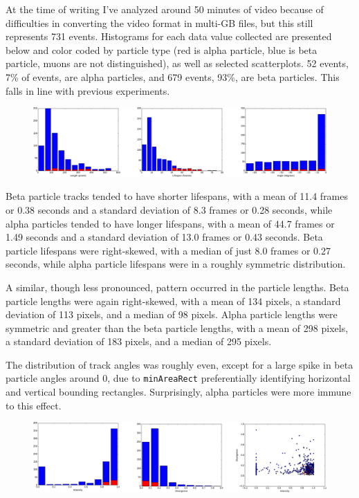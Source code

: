 \documentclass[notitlepage,12pt]{article}
\begin{document}
At the time of writing I've analyzed around 50 minutes of video because of difficulties in converting the video format in multi-GB files, but this still represents 731 events.  Histograms for each data value collected are presented below and color coded by particle type (red is alpha particle, blue is beta particle, muons are not distinguished), as well as selected scatterplots.  52 events, 7\% of events, are alpha particles, and 679 events, 93\%, are beta particles.  This falls in line with previous experiments.

\begin{figure}[h!]
	\centering
	\includegraphics[width=\textwidth]{length-life-angle}
\end{figure}

Beta particle tracks tended to have shorter lifespans, with a mean of 11.4 frames or 0.38 seconds and a standard deviation of 8.3 frames or 0.28 seconds, while alpha particles tended to have longer lifespans, with a mean of 44.7 frames or 1.49 seconds and a standard deviation of 13.0 frames or 0.43 seconds.  Beta particle lifespans were right-skewed, with a median of just 8.0 frames or 0.27 seconds, while alpha particle lifespans were in a roughly symmetric distribution. 

A similar, though less pronounced, pattern occurred in the particle lengths.  Beta particle lengths were again right-skewed, with a mean of 134 pixels, a standard deviation of 113 pixels, and a median of 98 pixels.  Alpha particle lengths were symmetric and greater than the beta particle lengths, with a mean of 298 pixels, a standard deviation of 183 pixels, and a median of 295 pixels.

The distribution of track angles was roughly even, except for a large spike in beta particle angles around 0, due to \texttt{minAreaRect} preferentially identifying horizontal and vertical bounding rectangles.  Surprisingly, alpha particles were more immune to this effect. 

\begin{figure}[h!]
	\centering
	\includegraphics[width=\textwidth]{intensity-divergence}
\end{figure}
\end{document}
